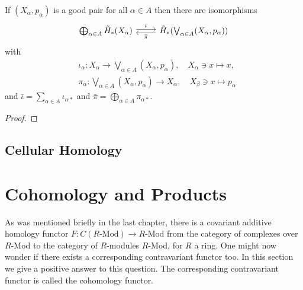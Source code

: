 \documentclass[a4paper,11pt]{article}
\begin{document}
				\begin{lemma}
					If $(X_\alpha,p_\alpha)$ is a good pair for all $\alpha\in A$ then there are isomorphisms 
					\begin{equation*}
						\begin{tikzcd}
							\bigoplus_{\alpha\in A}\rhg{X_\alpha}\ar[r,"\bar{\iota}",yshift=.5ex] & \ar[l,"\bar{\pi}",yshift=-.5ex]\rhg{\bigvee_{\alpha\in A}(X_\alpha,p_\alpha)}
						\end{tikzcd}
					\end{equation*}
					with 
					\begin{align*}
						&\iota_\alpha:X_\alpha\rightarrow\bigvee_{\alpha\in A}(X_\alpha,p_\alpha),\quad X_\alpha\ni x\mapsto x,\\
						&\pi_\alpha:\bigvee_{\alpha\in A}(X_\alpha,p_\alpha)\rightarrow X_\alpha,\quad X_\beta\ni x\mapsto p_\alpha
					\end{align*}
					and $\bar{\iota}=\sum_{\alpha\in A}\iota_{\alpha\ast}$ and $\bar{\pi}=\bigoplus_{\alpha\in A}\pi_{\alpha\ast}$.
				\end{lemma}
				\begin{proof}
					
				\end{proof}










		\subsection{Cellular Homology}











	\section{Cohomology and Products}
		
		As was mentioned briefly in the last chapter, there is a covariant additive homology functor $F:C(R\text{-Mod})\rightarrow R\text{-Mod}$ from the category of complexes over $R$-Mod to the category of $R$-modules $R$-Mod, for $R$ a ring. One might now wonder if there exists a corresponding contravariant functor too. In this section we give a positive answer to this question. The corresponding contravariant functor is called the cohomology functor.
\end{document}
